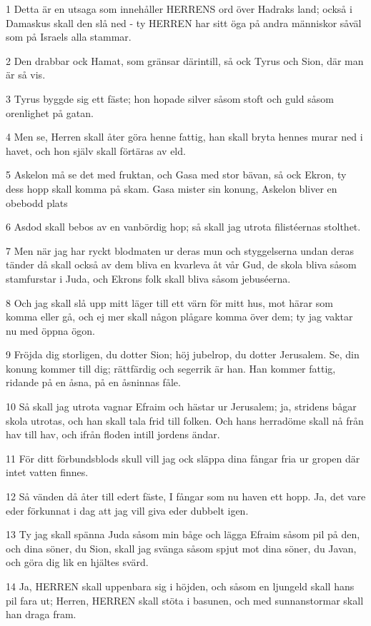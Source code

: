 \par 1 Detta är en utsaga som innehåller HERRENS ord över Hadraks land; också i Damaskus skall den slå ned - ty HERREN har sitt öga på andra människor såväl som på Israels alla stammar.
\par 2 Den drabbar ock Hamat, som gränsar därintill, så ock Tyrus och Sion, där man är så vis.
\par 3 Tyrus byggde sig ett fäste; hon hopade silver såsom stoft och guld såsom orenlighet på gatan.
\par 4 Men se, Herren skall åter göra henne fattig, han skall bryta hennes murar ned i havet, och hon själv skall förtäras av eld.
\par 5 Askelon må se det med fruktan, och Gasa med stor bävan, så ock Ekron, ty dess hopp skall komma på skam. Gasa mister sin konung, Askelon bliver en obebodd plats
\par 6 Asdod skall bebos av en vanbördig hop; så skall jag utrota filistéernas stolthet.
\par 7 Men när jag har ryckt blodmaten ur deras mun och styggelserna undan deras tänder då skall också av dem bliva en kvarleva åt vår Gud, de skola bliva såsom stamfurstar i Juda, och Ekrons folk skall bliva såsom jebuséerna.
\par 8 Och jag skall slå upp mitt läger till ett värn för mitt hus, mot härar som komma eller gå, och ej mer skall någon plågare komma över dem; ty jag vaktar nu med öppna ögon.
\par 9 Fröjda dig storligen, du dotter Sion; höj jubelrop, du dotter Jerusalem. Se, din konung kommer till dig; rättfärdig och segerrik är han. Han kommer fattig, ridande på en åsna, på en åsninnas fåle.
\par 10 Så skall jag utrota vagnar Efraim och hästar ur Jerusalem; ja, stridens bågar skola utrotas, och han skall tala frid till folken. Och hans herradöme skall nå från hav till hav, och ifrån floden intill jordens ändar.
\par 11 För ditt förbundsblods skull vill jag ock släppa dina fångar fria ur gropen där intet vatten finnes.
\par 12 Så vänden då åter till edert fäste, I fångar som nu haven ett hopp. Ja, det vare eder förkunnat i dag att jag vill giva eder dubbelt igen.
\par 13 Ty jag skall spänna Juda såsom min båge och lägga Efraim såsom pil på den, och dina söner, du Sion, skall jag svänga såsom spjut mot dina söner, du Javan, och göra dig lik en hjältes svärd.
\par 14 Ja, HERREN skall uppenbara sig i höjden, och såsom en ljungeld skall hans pil fara ut; Herren, HERREN skall stöta i basunen, och med sunnanstormar skall han draga fram.
